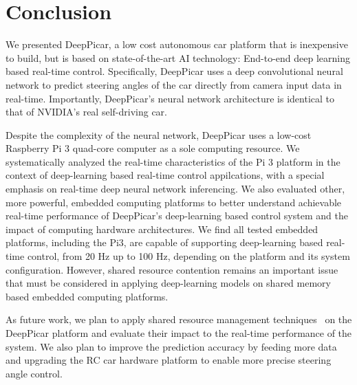 \section{Conclusion}\label{sec:conclusion}
We presented DeepPicar, a low cost autonomous car platform that is
inexpensive to build, but is based on state-of-the-art AI technology:
End-to-end deep learning based real-time control.
Specifically, DeepPicar uses a deep convolutional neural network to
predict steering angles of the car directly from camera input data
in real-time. Importantly, DeepPicar's neural network architecture is
identical to that of NVIDIA's real self-driving car. 

Despite the complexity of the neural network, DeepPicar uses a
low-cost Raspberry Pi 3 quad-core computer as a sole computing
resource. We systematically analyzed the real-time characteristics of
the Pi 3 platform in the context of deep-learning based real-time
control appilcations, with a special emphasis on real-time deep neural
network inferencing.
We also evaluated other, more powerful, embedded computing
platforms to better understand achievable real-time performance of
DeepPicar's deep-learning based control system and the impact of
computing hardware architectures.
We find all tested embedded platforms, including the Pi3, are capable
of supporting deep-learning based real-time control, from 20 Hz up to
100 Hz, depending on the platform and its system
configuration. However, shared resource contention remains an
important issue that must be considered in applying deep-learning
models on shared memory based embedded computing platforms.


As future work, we plan to apply shared resource management
techniques~\cite{Yun2013,yun2014rtas} on the DeepPicar platform and
evaluate their impact to the real-time performance of the system. We
also plan to improve the prediction accuracy by feeding more data and
upgrading the RC car hardware platform to enable more precise steering
angle control.


